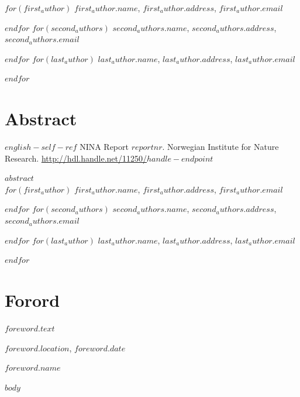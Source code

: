 \documentclass[11pt, a4paper]{article}
\renewcommand*{\href}[2]{\hyperref[#1]{\color{darkblue}\setulcolor{darkblue}\ul{\mbox{#2}}}}
\begin{document}
\vspace{1cm}
\small
$for(first_author)$
$first_author.name$, $first_author.address$, $first_author.email$  \par
$endfor$
$for(second_authors)$
$second_authors.name$, $second_authors.address$, $second_authors.email$  \par
$endfor$
$for(last_author)$
$last_author.name$, $last_author.address$, $last_author.email$  \par
$endfor$
\normalsize
\clearpage

\setcounter{secnumdepth}{0}
\section{Abstract}
\small{$english-self-ref$} NINA Report $reportnr$. Norwegian Institute for Nature Research. \href{http://hdl.handle.net/11250/$handle-endpoint$}{http://hdl.handle.net/11250/$handle-endpoint$}\par
\vspace{0.5cm}
\normalsize{
$abstract$} \\

\vspace{1cm}
\small
$for(first_author)$
$first_author.name$, $first_author.address$, $first_author.email$  \par
$endfor$
$for(second_authors)$
$second_authors.name$, $second_authors.address$, $second_authors.email$  \par
$endfor$
$for(last_author)$
$last_author.name$, $last_author.address$, $last_author.email$  \par
$endfor$
\normalsize
\clearpage


\doublespacing
\tableofcontents
{}
\singlespacing
\clearpage

\section{Forord}

\normalsize
$foreword.text$\par
\medskip
$foreword.location$, $foreword.date$\par
\medskip
$foreword.name$



\clearpage
\setcounter{secnumdepth}{4}
\setlength{\parskip}{6pt}

$body$



\clearpage 


\Ifthispageodd{%
    \fancyhf{} \null \clearpage 
    \pagestyle{endfooter} \null
}{%
    \pagestyle{endfooter} \null
}
\end{document}
